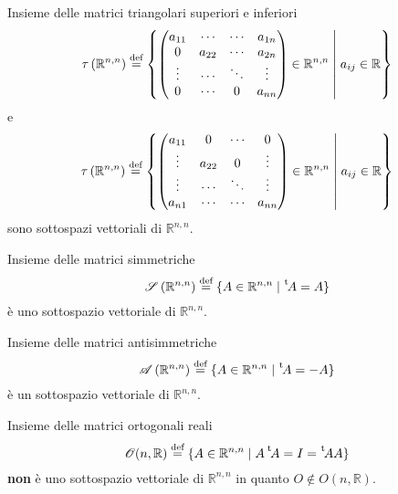 \begin{Ex}{Insieme delle matrici triangolari superiori e inferiori}
    \begin{equation*}
      \tau \left( \mathbb{R}^{n,n} \right)\bydef \left\{
        \begin{pmatrix}
          a_{11} & \cdots & \cdots & a_{1n}\\
          0 & a_{22} & \cdots & a_{2n}\\
          \vdots & \cdots & \ddots & \vdots\\
          0 & \cdots & 0 & a_{nn}
        \end{pmatrix}\in\mathbb{R}^{n,n}
        \Setsuchthat a_{ij}\in\mathbb{R}
      \right\}
    \end{equation*}
    e
    \begin{equation*}
      \tau \left( \mathbb{R}^{n,n} \right)\bydef \left\{
        \begin{pmatrix}
          a_{11} & 0 & \cdots & 0\\
          \vdots & a_{22} & 0 & \vdots\\
          \vdots & \cdots & \ddots & \vdots\\
          a_{n1} & \cdots & \cdots & a_{nn}
        \end{pmatrix}\in\mathbb{R}^{n,n}
        \Setsuchthat a_{ij}\in\mathbb{R}
      \right\}
    \end{equation*}
    sono sottospazi vettoriali di $\mathbb{R}^{n,n}$.
\end{Ex}

\begin{Ex}{Insieme delle matrici simmetriche}
  \begin{equation*}
    \mathscr{S}\left( \mathbb{R}^{n,n} \right)\bydef \left\{A\in\mathbb{R}^{n,n}\Setsuchthat
    \transp A = A\right\}
  \end{equation*}
  è uno sottospazio vettoriale di $\mathbb{R}^{n,n}$.
\end{Ex}

\begin{Ex}{Insieme delle matrici antisimmetriche}
  \begin{equation*}
    \mathscr{A}\left( \mathbb{R}^{n,n} \right)\bydef \left\{A\in\mathbb{R}^{n,n}\Setsuchthat
    \transp A = -A\right\}
  \end{equation*}
  è un sottospazio vettoriale di $\mathbb{R}^{n,n}$.
\end{Ex}

\begin{Ex}{Insieme delle matrici ortogonali reali}
  \begin{equation*}
    \mathscr{O}(n,\mathbb{R})\bydef \left\{ A\in\mathbb{R}^{n,n}\Setsuchthat A\transp A
    = I = \transp A A\right\}
  \end{equation*}
  \textbf{non} è uno sottospazio vettoriale di $\mathbb{R}^{n,n}$ in quanto $O\notin
  O(n,\mathbb{R})$.
\end{Ex}

